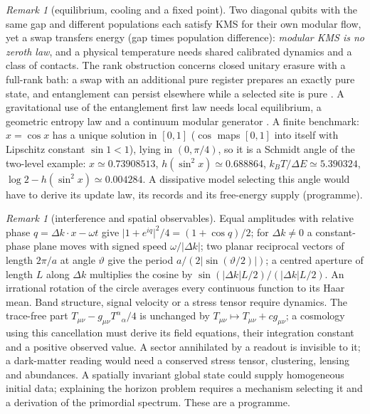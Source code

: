 \documentclass[aps,pra,onecolumn,superscriptaddress,nofootinbib,10pt]{revtex4-2}
\theoremstyle{definition}
\theoremstyle{remark}
\newtheorem{remark}[theorem]{Remark}
\begin{document}
\begin{remark}[equilibrium, cooling and a fixed point]\label{rem:cuarrow}
Two diagonal qubits with the same gap and different populations each satisfy KMS for their own
modular flow, yet a swap transfers energy (gap times population difference): \emph{modular KMS is no
zeroth law}, and a physical temperature needs shared calibrated dynamics and a class of contacts.  The
rank obstruction concerns closed unitary erasure with a full-rank bath: a swap with an additional pure
register prepares an exactly pure state, and entanglement can persist elsewhere while a selected site is
pure \cite{n1-mo}.  A gravitational use of the entanglement first law needs local equilibrium, a
geometric entropy law and a continuum modular generator \cite{n1-jacobson}.  A finite benchmark: $x=\cos x$
has a unique solution in $[0,1]$ ($\cos$ maps $[0,1]$ into itself with Lipschitz constant $\sin1<1$), lying in
$(0,\pi/4)$, so it is a Schmidt angle of the two-level example: $x\simeq0.73908513$, $h(\sin^2x)\simeq0.688864$,
$k_BT/\Delta E\simeq5.390324$, $\log2-h(\sin^2x)\simeq0.004284$.  A dissipative model selecting this angle would have to derive its update
law, its records and its free-energy supply (programme).
\end{remark}

\begin{remark}[interference and spatial observables]\label{rem:cuinterf}
Equal amplitudes with relative phase $q=\Delta k\cdot x-\omega t$ give $\lvert1+e^{iq}\rvert^2/4=(1+\cos q)/2$; for $\Delta k\ne0$ a constant-phase
plane moves with signed speed $\omega/\lvert\Delta k\rvert$; two planar reciprocal vectors of length $2\pi/a$ at angle $\vartheta$ give the
period $a/(2\lvert\sin(\vartheta/2)\rvert)$; a centred aperture of length $L$ along $\Delta k$ multiplies the cosine by $\sin(\lvert\Delta k\rvert L/2)/(\lvert\Delta k\rvert L/2)$.  An
irrational rotation of the circle averages every continuous function to its Haar mean.  Band structure,
signal velocity or a stress tensor require dynamics.  The trace-free part $T_{\mu\nu}-g_{\mu\nu}T^\alpha{}_\alpha/4$ is unchanged by $T_{\mu\nu}\mapsto T_{\mu\nu}+cg_{\mu\nu}$;
a cosmology using this cancellation must derive its field equations, their integration constant and a
positive observed value.  A sector annihilated by a readout is invisible to it; a dark-matter reading
would need a conserved stress tensor, clustering, lensing and abundances.  A spatially invariant global
state could supply homogeneous initial data; explaining the horizon problem requires a mechanism
selecting it and a derivation of the primordial spectrum.  These are a programme.
\end{remark}
\end{document}

